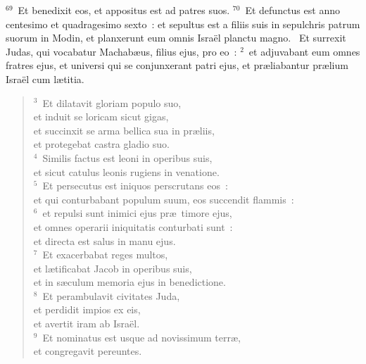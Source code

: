 ${}^{69}$~Et benedixit eos, et appositus est ad patres suos.
${}^{70}$~Et defunctus est anno centesimo et quadragesimo sexto~: et sepultus est a filiis suis in sepulchris patrum suorum in Modin, et planxerunt eum omnis Isra\"el planctu magno.
~Et surrexit Judas, qui vocabatur Machab\ae us, filius ejus, pro eo~:
${}^{2}$~et adjuvabant eum omnes fratres ejus, et universi qui se conjunxerant patri ejus, et pr\ae liabantur pr\ae lium Isra\"el cum l\ae titia.
\begin{flushleft}\begin{verse}${}^{3}$~Et dilatavit gloriam populo suo,\\ et induit se loricam sicut gigas,\\ et succinxit se arma bellica sua in pr\ae liis,\\ et protegebat castra gladio suo.\\
${}^{4}$~Similis factus est leoni in operibus suis,\\ et sicut catulus leonis rugiens in venatione.\\
${}^{5}$~Et persecutus est iniquos perscrutans eos~:\\ et qui conturbabant populum suum, eos succendit flammis~:\\
${}^{6}$~et repulsi sunt inimici ejus pr\ae\ timore ejus,\\ et omnes operarii iniquitatis conturbati sunt~:\\ et directa est salus in manu ejus.\\
${}^{7}$~Et exacerbabat reges multos,\\ et l\ae tificabat Jacob in operibus suis,\\ et in s\ae culum memoria ejus in benedictione.\\
${}^{8}$~Et perambulavit civitates Juda,\\ et perdidit impios ex eis,\\ et avertit iram ab Isra\"el.\\
${}^{9}$~Et nominatus est usque ad novissimum terr\ae ,\\ et congregavit pereuntes.\end{verse}\end{flushleft}


